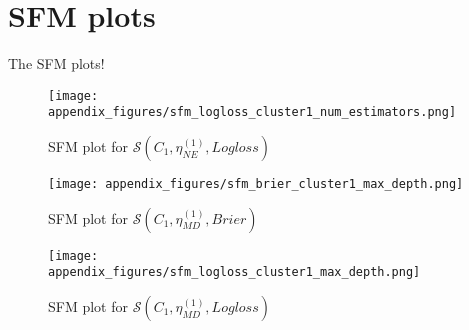 \chapter{SFM plots}
\label{ape:sfm-plots}

The SFM plots!

\singlespacing

\renewcommand{\arraystretch}{0.85}
\captionsetup{margin=1.0cm}  %


\begin{figure}[!h]
    \centering
    \texttt{[image: appendix\_figures/sfm\_logloss\_cluster1\_num\_estimators.png]}
    \caption{SFM plot for $\mathcal{S}(C_1, \eta^{(1)}_{NE}, Logloss)$}
\end{figure}


\begin{figure}[!h]
    \centering
    \texttt{[image: appendix\_figures/sfm\_brier\_cluster1\_max\_depth.png]}
    \caption{SFM plot for $\mathcal{S}(C_1, \eta^{(1)}_{MD}, Brier)$}
\end{figure}


\begin{figure}[!h]
    \centering
    \texttt{[image: appendix\_figures/sfm\_logloss\_cluster1\_max\_depth.png]}
    \caption{SFM plot for $\mathcal{S}(C_1, \eta^{(1)}_{MD}, Logloss)$}
\end{figure}









